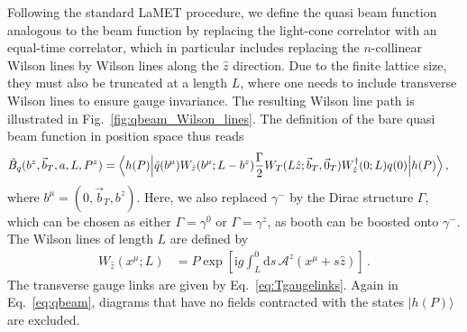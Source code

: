 \documentclass[11pt,a4paper]{article}
\DeclareRobustCommand{\eq}[1]{Eq.~\eqref{eq:#1}}
\DeclareRobustCommand{\fig}[1]{Fig.~\ref{fig:#1}}
\newcommand{\df}{\mathrm{d}}
\newcommand{\img}{\mathrm{i}}
\newcommand{\cA}{\mathcal{A}}
\newcommand{\bt}{\vec b_T}
\begin{document}
Following the standard LaMET procedure, we define the quasi beam function analogous to the beam function
by replacing the light-cone correlator with an equal-time correlator,
which in particular includes replacing the $n$-collinear Wilson lines by Wilson lines along the $\hat z$ direction.
Due to the finite lattice size, they must also be truncated at a length $L$,
where one needs to include transverse Wilson lines to ensure gauge invariance.
The resulting Wilson line path is illustrated in \fig{qbeam_Wilson_lines}.
The definition of the bare quasi beam function in position space thus reads
\begin{align} \label{eq:qbeam}
 \tilde B_{q}(b^z, \bt, a,L,P^z) =
 \Bigl< h(P) \Big| &\bar q(b^\mu) W_{\hat z}(b^\mu;L-b^z) \frac{\Gamma}{2}
 W_T(L \hat z; \bt, \vec{0}_T) W^\dagger_{\hat z}(0;L) q(0) \Big| h(P) \Bigr>
\,,\end{align}
where $b^\mu = (0, \bt, b^z)$.
Here, we also replaced $\gamma^-$ by the Dirac structure $\Gamma$, which can be chosen as either $\Gamma = \gamma^0$ or $\Gamma = \gamma^z$, as booth can be boosted onto $\gamma^-$.
The Wilson lines of length $L$ are defined by
\begin{align} \label{eq:coll_Wilson_L}
 W_{\hat z}(x^\mu;L) &= P \exp\left[ \img g \int_{L}^0 \df s \, \cA^z(x^\mu + s \hat z) \right]
\,.\end{align}
The transverse gauge links are given by \eq{Tgaugelinks}.   Again in \eq{qbeam}, diagrams that have no fields contracted with the states $|h(P)\rangle$ are excluded.
\end{document}
